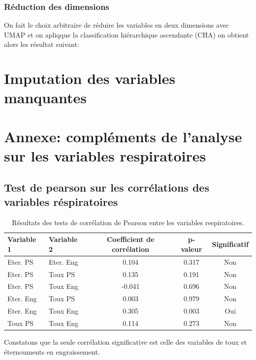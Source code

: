 \documentclass{article}
\begin{document}
\subsubsection{Réduction des dimensions}
On fait le choix arbitraire de réduire les variables en deux dimensions avec UMAP et on apliqque la classification hiérarchique ascendante (CHA) on obtient alors les résultat suivant:

\newpage

\section{Imputation des variables manquantes}

\newpage
\appendix

\section{Annexe: compléments de l'analyse sur les variables respiratoires}
\subsection{Test de pearson sur les corrélations des variables réspiratoires}\label{annexe:pearson}

\begin{table}[ht]
    \centering
    \begin{tabular}{llccc}
    \toprule
    \textbf{Variable 1} & \textbf{Variable 2} & \textbf{Coefficient de corrélation} & \textbf{p-valeur} & \textbf{Significatif} \\
    \midrule
    Eter. PS & Eter. Eng & 0.104 & 0.317 & Non \\
    Eter. PS & Toux PS & 0.135 & 0.191 & Non \\
    Eter. PS & Toux Eng & -0.041 & 0.696 & Non \\
    Eter. Eng & Toux PS & 0.003 & 0.979 & Non \\
    Eter. Eng & Toux Eng & 0.305 & 0.003 & Oui \\
    Toux PS & Toux Eng & 0.114 & 0.273 & Non \\
    \bottomrule
    \end{tabular}
    \caption{Résultats des tests de corrélation de Pearson entre les variables respiratoires.}\label{tab:correlation_results}
\end{table}
Constatons que la seule corrélation significative est celle des variables de toux et éternouments en engraissement. 
\end{document}
